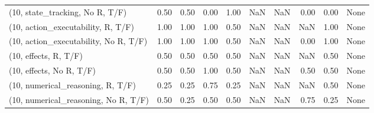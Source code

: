 \begin{table*}[h!]
\begin{adjustbox}{width=2\columnwidth,center}
\begin{tabular}{lrrr|rrr|rrr}
(10, state\_tracking, No R, T/F)       &                      0.50 &                  0.50 &                      0.00 &                          1.00 &                       NaN &                           NaN &                                   0.00 &                               0.00 &                                  None \\
(10, action\_executability, R, T/F)    &                      1.00 &                  1.00 &                      1.00 &                          0.50 &                       NaN &                           NaN &                                    NaN &                               1.00 &                                  None \\
(10, action\_executability, No R, T/F) &                      1.00 &                  1.00 &                      1.00 &                          0.50 &                       NaN &                           NaN &                                   0.00 &                               1.00 &                                  None \\
(10, effects, R, T/F)                 &                      0.50 &                  0.50 &                      0.50 &                          0.50 &                       NaN &                           NaN &                                    NaN &                               0.50 &                                  None \\
(10, effects, No R, T/F)              &                      0.50 &                  0.50 &                      1.00 &                          0.50 &                       NaN &                           NaN &                                   0.50 &                               0.50 &                                  None \\
(10, numerical\_reasoning, R, T/F)     &                      0.25 &                  0.25 &                      0.75 &                          0.25 &                       NaN &                           NaN &                                    NaN &                               0.50 &                                  None \\
(10, numerical\_reasoning, No R, T/F)  &                      0.50 &                  0.25 &                      0.50 &                          0.50 &                       NaN &                           NaN &                                   0.75 &                               0.25 &                                  None \\

\end{tabular}
\end{adjustbox}
\end{table*}
